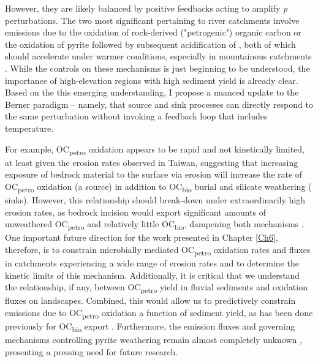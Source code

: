 However, they are likely balanced by positive feedbacks acting to amplify \textit{p} perturbations. The two most significant pertaining to river catchments involve  emissions due to the oxidation of rock-derived ("petrogenic") organic carbon \citep[OC\textsubscript{petro};][Chapter \ref{Ch6}]{Hilton:2014dh} or the oxidation of pyrite followed by subsequent acidification of  \citep{Torres:2014cx}, both of which should accelerate under warmer conditions, especially in mountainous catchments \citep{Torres:2016bd}. While the controls on these mechanisms is just beginning to be understood, the importance of high-elevation regions with high sediment yield is already clear. Based on the this emerging understanding, I propose a nuanced update to the Berner paradigm -- namely, that  source and sink processes can directly respond to the same perturbation without invoking a feedback loop that includes temperature.

For example, OC\textsubscript{petro} oxidation appears to be rapid and not kinetically limited, at least given the erosion rates observed in Taiwan, suggesting that increasing exposure of bedrock material to the surface via erosion will increase the rate of OC\textsubscript{petro} oxidation (a  source) in addition to OC\textsubscript{bio} burial and silicate weathering ( sinks). However, this relationship should break-down under extraordinarily high erosion rates, as bedrock incision would export significant amounts of unweathered OC\textsubscript{petro} and relatively little OC\textsubscript{bio}, dampening both mechanisms \citep{Hilton:2011jw}. One important future direction for the work presented in Chapter \ref{Ch6}, therefore, is to constrain microbially mediated OC\textsubscript{petro} oxidation rates and fluxes in catchments experiencing a wide range of erosion rates and to determine the kinetic limits of this mechanism. Additionally, it is critical that we understand the relationship, if any, between OC\textsubscript{petro} yield in fluvial sediments and oxidation fluxes on landscapes. Combined, this would allow us to predictively constrain  emissions due to OC\textsubscript{petro} oxidation a function of sediment yield, as has been done previously for OC\textsubscript{bio} export \citep{Galy:2015fx}. Furthermore, the  emission fluxes and governing mechanisms controlling pyrite weathering remain almost completely unknown \citep{Calmels:2007fk,Torres:2014cx}, presenting a pressing need for future research. 

